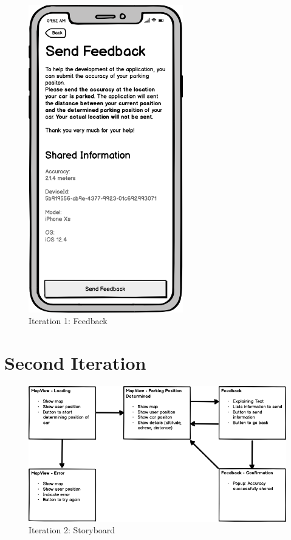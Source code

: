 \begin{figure}[H]
  \centering
  \begin{minipage}[b]{0.45\textwidth}
    \centering
    \includegraphics[width=0.6\textwidth]{images/UI/Iteration1-Feedback.png}
    \caption{Iteration 1: Feedback}
    \label{fig:i1-feedback}
  \end{minipage}
  \hfill
  \begin{minipage}[b]{0.45\textwidth}
    
  \end{minipage}
\end{figure}



\section{Second Iteration}

\begin{figure}[H]
    \centering
    \includegraphics[width=\textwidth]{images/UI/Iteration2-Overview.png}
    \caption{Iteration 2: Storyboard}
    \label{fig:i2story}
\end{figure}

